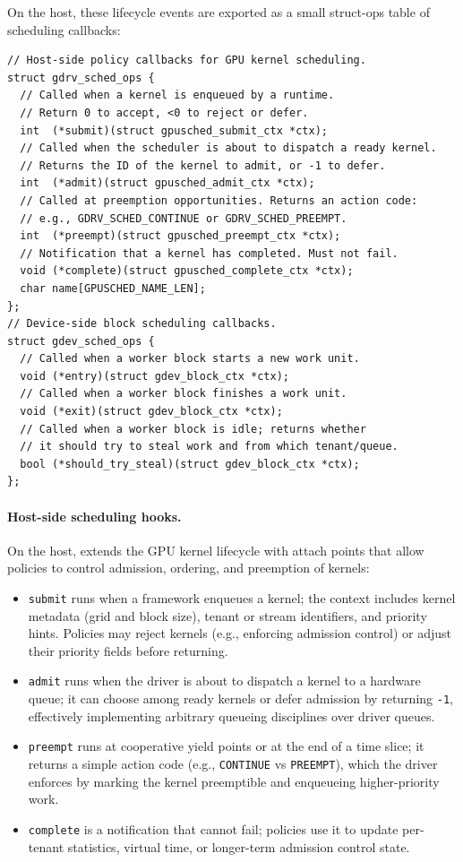 On the host, these lifecycle events are exported as a small struct-ops table of
scheduling callbacks:

\begin{verbatim}
// Host-side policy callbacks for GPU kernel scheduling.
struct gdrv_sched_ops {
  // Called when a kernel is enqueued by a runtime.
  // Return 0 to accept, <0 to reject or defer.
  int  (*submit)(struct gpusched_submit_ctx *ctx);
  // Called when the scheduler is about to dispatch a ready kernel.
  // Returns the ID of the kernel to admit, or -1 to defer.
  int  (*admit)(struct gpusched_admit_ctx *ctx);
  // Called at preemption opportunities. Returns an action code:
  // e.g., GDRV_SCHED_CONTINUE or GDRV_SCHED_PREEMPT.
  int  (*preempt)(struct gpusched_preempt_ctx *ctx);
  // Notification that a kernel has completed. Must not fail.
  void (*complete)(struct gpusched_complete_ctx *ctx);
  char name[GPUSCHED_NAME_LEN];
};
// Device-side block scheduling callbacks.
struct gdev_sched_ops {
  // Called when a worker block starts a new work unit.
  void (*entry)(struct gdev_block_ctx *ctx);
  // Called when a worker block finishes a work unit.
  void (*exit)(struct gdev_block_ctx *ctx);
  // Called when a worker block is idle; returns whether
  // it should try to steal work and from which tenant/queue.
  bool (*should_try_steal)(struct gdev_block_ctx *ctx);
};
\end{verbatim}

\paragraph{Host-side scheduling hooks.}
On the host, \sys extends the GPU kernel lifecycle with attach points that allow
policies to control admission, ordering, and preemption of kernels:

\begin{itemize}[leftmargin=*]
  \item \texttt{submit} runs when a framework enqueues a kernel; the context includes kernel metadata (grid and block size), tenant or stream identifiers, and priority hints. Policies may reject kernels (e.g., enforcing admission control) or adjust their priority fields before returning.
  \item \texttt{admit} runs when the driver is about to dispatch a kernel to a hardware queue; it can choose among ready kernels or defer admission by returning \texttt{-1}, effectively implementing arbitrary queueing disciplines over driver queues.
  \item \texttt{preempt} runs at cooperative yield points or at the end of a time slice; it returns a simple action code (e.g., \texttt{CONTINUE} vs \texttt{PREEMPT}), which the driver enforces by marking the kernel preemptible and enqueueing higher-priority work.
  \item \texttt{complete} is a notification that cannot fail; policies use it to update per-tenant statistics, virtual time, or longer-term admission control state.
\end{itemize}

